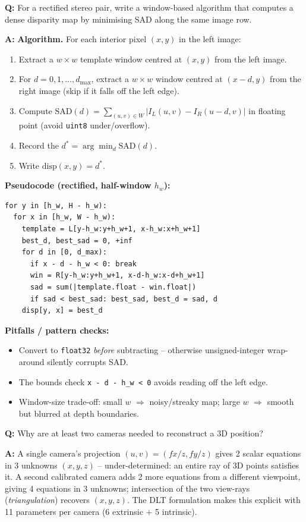 \begin{exbox}
\textbf{Q:} For a rectified stereo pair, write a window-based algorithm that computes a dense disparity map by minimising SAD along the same image row.

\textbf{A:} \textbf{Algorithm.} For each interior pixel $(x,y)$ in the left image:
\begin{enumerate}
  \item Extract a $w \times w$ template window centred at $(x,y)$ from the left image.
  \item For $d = 0, 1, \ldots, d_{\max}$, extract a $w \times w$ window centred at $(x-d, y)$ from the right image (skip if it falls off the left edge).
  \item Compute $\text{SAD}(d) = \sum_{(u,v)\in W} | I_L(u,v) - I_R(u-d,v) |$ in floating point (avoid \texttt{uint8} under/overflow).
  \item Record the $d^* = \arg\min_d \text{SAD}(d)$.
  \item Write $\text{disp}(x,y) = d^*$.
\end{enumerate}
\textbf{Pseudocode (rectified, half-window $h_w$):}
\begin{verbatim}
for y in [h_w, H - h_w):
  for x in [h_w, W - h_w):
    template = L[y-h_w:y+h_w+1, x-h_w:x+h_w+1]
    best_d, best_sad = 0, +inf
    for d in [0, d_max):
      if x - d - h_w < 0: break
      win = R[y-h_w:y+h_w+1, x-d-h_w:x-d+h_w+1]
      sad = sum(|template.float - win.float|)
      if sad < best_sad: best_sad, best_d = sad, d
    disp[y, x] = best_d
\end{verbatim}
\textbf{Pitfalls / pattern checks:}
\begin{itemize}
  \item Convert to \texttt{float32} \emph{before} subtracting -- otherwise unsigned-integer wrap-around silently corrupts SAD.
  \item The bounds check \texttt{x - d - h\_w < 0} avoids reading off the left edge.
  \item Window-size trade-off: small $w$ $\Rightarrow$ noisy/streaky map; large $w$ $\Rightarrow$ smooth but blurred at depth boundaries.
\end{itemize}
\end{exbox}

\begin{exbox}
\textbf{Q:} Why are at least two cameras needed to reconstruct a 3D position?

\textbf{A:} A single camera's projection $(u,v) = (fx/z, fy/z)$ gives 2 scalar equations in 3 unknowns $(x,y,z)$ -- under-determined: an entire ray of 3D points satisfies it. A second calibrated camera adds 2 more equations from a different viewpoint, giving 4 equations in 3 unknowns; intersection of the two view-rays (\emph{triangulation}) recovers $(x,y,z)$. The DLT formulation makes this explicit with 11 parameters per camera (6 extrinsic $+$ 5 intrinsic).
\end{exbox}

